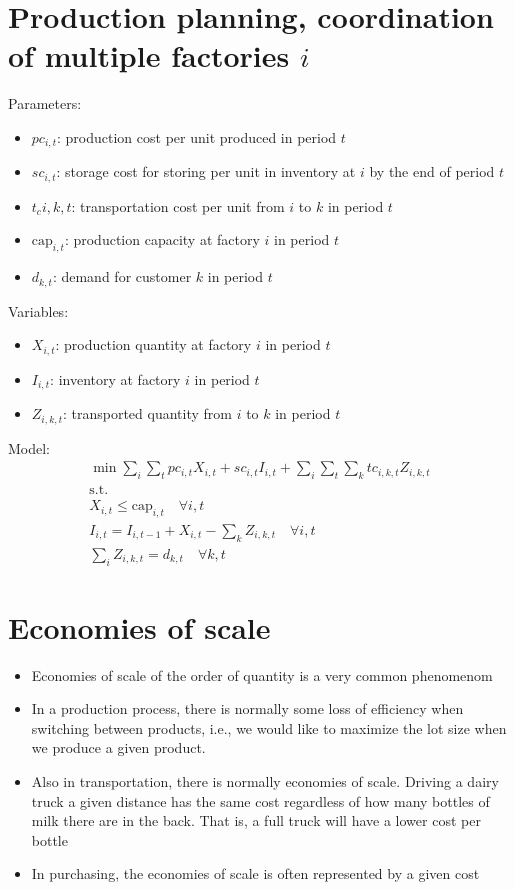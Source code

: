 \documentclass[10pt]{article}
\begin{document}
\section{Production planning, coordination of multiple factories $i $}
Parameters: 
\begin{itemize}
    \item $pc_{i, t} $: production cost per unit produced in period $t $
    \item $sc_{i, t} $: storage cost for storing per unit in inventory at $i $ by the end of period $t $
    \item $t_c{i, k, t} $: transportation cost per unit from $i $ to $k $ in period $t $
    \item $\text{cap}_{i, t} $: production capacity at factory $i $ in period $t $
    \item $d_{k, t}$: demand for customer $k $ in period $t $
\end{itemize}
Variables:
\begin{itemize}
    \item $X_{i, t} $: production quantity at factory $i $ in period $t $
    \item $I_{i, t}$: inventory at factory $ i $ in period $ t $
    \item $Z_{i, k, t} $: transported quantity from $i $ to $k $ in period $ t $
\end{itemize}
Model: 
\begin{gather*}
    \min \sum_i\sum_tpc_{i, t}X_{i, t} + sc_{i, t}I_{i, t} + \sum_i\sum_t\sum_ktc_{i, k, t}Z_{i, k, t}\\
    \text{s.t.}\\
    X_{i, t} \le \text{cap}_{i, t}\quad\forall i, t\\
    I_{i, t} = I_{i, t - 1} + X_{i, t} - \sum_kZ_{i, k, t}\quad\forall i, t\\
    \sum_iZ_{i, k, t} = d_{k, t}\quad\forall k, t
\end{gather*}
\section{Economies of scale}
\begin{itemize}
    \item Economies of scale of the order of quantity is a very common phenomenom
    \item In a production process, there is normally some loss of efficiency when switching between products, i.e., we would like to maximize the lot size when we produce a given product. 
    \item Also in transportation, there is normally economies of scale. Driving a dairy truck a given distance has the same cost regardless of how many bottles of milk there are in the back. That is, a full truck will have a lower cost per bottle 
    \item In purchasing, the economies of scale is often represented by a given cost
\end{itemize}
\end{document}
